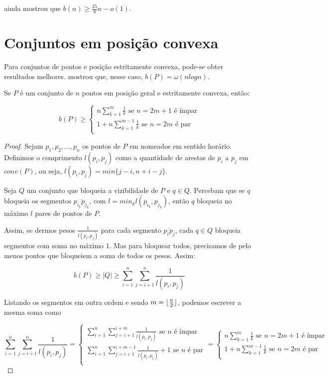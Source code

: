 \cite{block} ainda mostrou que $b(n)\geq \frac{25}{8}n-o(1)$.

\section {Conjuntos em posição convexa}
Para conjuntos de pontos e posição estritamente convexa, pode-se obter resultados melhores. \cite{blockers} mostrou que, nesse caso, $b(P)=\omega(nlogn)$.

\begin{teorema}
Se $P$ é um conjunto de $n$ pontos em posição geral e estritamente convexa, então:

    $$b(P)\geq
    \begin{cases}
        n\sum_{k=1}^m\frac{1}{k} \text{ se }n=2m+1\text{ é ímpar}\\
        1+n\sum_{k=1}^{m-1}\frac{1}{k} \text{ se }n=2m\text{ é par}\\
    \end{cases}$$
\end{teorema}
\begin{proof}
    Sejam $p_1, p_2, ..., p_n$ os pontos de $P$ em nomeados em sentido horário. Definimos o comprimento $l(p_i, p_j)$ como a quantidade de arestas de $p_i$ a $p_j$ em $conv(P)$, ou seja, $l(p_i, p_j) = min\{j-i, n+i-j\}$.

    Seja $Q$ um conjunto que bloqueia a vizibilidade de $P$ e $q\in Q$. Percebam que se $q$ bloqueia os segmentos $\overline{p_{i_k}p_{j_k}}$, com $l=min_k{l(p_{i_k},p_{j_k})}$, então $q$ bloqueia no máximo $l$ pares de pontos de $P$.

    Assim, se dermos pesos $\frac{1}{l(p_i,p_j)}$ para cada segmento $\overline{p_ip_j}$, cada $q\in Q$ bloqueia segmentos com soma no máximo $1$. Mas para bloquear todos, precisamos de pelo menos pontos que bloqueiem a soma de todos os pesos.
    Assim:

    $$b(P)\geq |Q|\geq \sum_{i=1}^{n}\sum_{j=i+1}^{n}\frac{1}{l(p_i,p_j)}$$

    Listando os segmentos em outra ordem e sendo $m=\lfloor\frac{n}{2}\rfloor$, podemos escrever a mesma soma como

    $$\sum_{i=1}^{n}\sum_{j=i+1}^{n}\frac{1}{l(p_i,p_j)} = 
    \begin{cases}
        \sum_{i=1}^n\sum_{j=i+1}^{i+m}\frac{1}{l(p_i, p_j)} \text{ se }n\text{ é ímpar}\\
        \sum_{i=1}^n\sum_{j=i+1}^{i+m-1}\frac{1}{l(p_i, p_j)} + 1 \text{ se }n\text{ é par}\\
    \end{cases}=
    \begin{cases}
        n\sum_{k=1}^m\frac{1}{k} \text{ se }n=2m+1\text{ é ímpar}\\
        1+n\sum_{k=1}^{m-1}\frac{1}{k} \text{ se }n=2m\text{ é par}\\
    \end{cases}$$
\end{proof}

